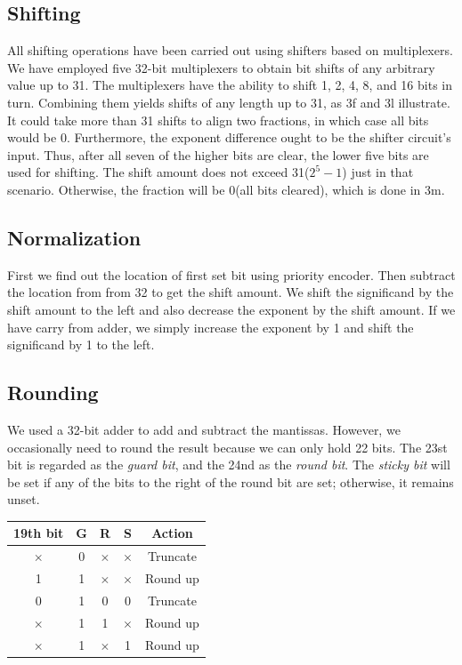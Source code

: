\documentclass[a4paper,12pt]{article}
\begin{document}
\subsection{Shifting}
All shifting operations have been carried out using shifters based on
multiplexers. We have employed five 32-bit multiplexers to obtain bit shifts of
any arbitrary value up to 31. The multiplexers have the ability to shift 1, 2,
4, 8, and 16 bits in turn. Combining them yields shifts of any length up to 31,
as 3f and 3l illustrate. It could take more than 31 shifts to align two
fractions, in which case all bits would be 0. Furthermore, the exponent
difference ought to be the shifter circuit's input. Thus, after all seven of
the higher bits are clear, the lower five bits are used for shifting. The shift
amount does not exceed 31($2^{5}-1$) just in that scenario. Otherwise, the
fraction will be 0(all bits cleared), which is done in 3m.

\subsection{Normalization}
First we find out the location of first set bit using priority encoder. Then
subtract the location from from 32 to get the shift amount. We shift the
significand by the shift amount to the left and also decrease the exponent by
the shift amount. If we have carry from adder, we simply increase the exponent
by 1 and shift the significand by 1 to the left.

\subsection{Rounding}
We used a 32-bit adder to add and subtract the mantissas. However, we
occasionally need to round the result because we can only hold 22 bits. The
23st bit is regarded as the \textit{guard bit}, and the 24nd as the
\textit{round bit}. The \textit{sticky bit} will be set if any of the bits to
the right of the round bit are set; otherwise, it remains unset.
\begin{table}[h!]
    \centering
    \begin{tabular}{|c|c|c|c|c|}
        \hline
        19th bit & G & R        & S        & Action   \\ \hline
        $\times$ & 0 & $\times$ & $\times$ & Truncate \\ \hline
        1        & 1 & $\times$ & $\times$ & Round up \\ \hline
        0        & 1 & 0        & 0        & Truncate \\ \hline
        $\times$ & 1 & 1        & $\times$ & Round up \\ \hline
        $\times$ & 1 & $\times$ & 1        & Round up \\ \hline
    \end{tabular}
\end{table}
\end{document}

